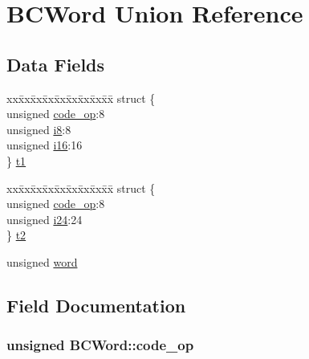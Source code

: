 \hypertarget{unionBCWord}{}\section{B\+C\+Word Union Reference}
\label{unionBCWord}
\subsection*{Data Fields}
\begin{DoxyCompactItemize}
\item 
\begin{tabbing}
xx\=xx\=xx\=xx\=xx\=xx\=xx\=xx\=xx\=\kill
struct \{\\
\>unsigned \hyperlink{unionBCWord_aade3fc7c8f3c2cd46214543bf0979e14}{code\_op}:8\\
\>unsigned \hyperlink{unionBCWord_ab9456d8bd041583a32520027206f37ca}{i8}:8\\
\>unsigned \hyperlink{unionBCWord_a8c3329540a5e15a320ee046bcc68f3b4}{i16}:16\\
\} \hyperlink{unionBCWord_a70e755edbb220fd93df2c19803233c99}{t1}\\

\end{tabbing}\item 
\begin{tabbing}
xx\=xx\=xx\=xx\=xx\=xx\=xx\=xx\=xx\=\kill
struct \{\\
\>unsigned \hyperlink{unionBCWord_aade3fc7c8f3c2cd46214543bf0979e14}{code\_op}:8\\
\>unsigned \hyperlink{unionBCWord_a1b4781c273f33c444975a5c427370504}{i24}:24\\
\} \hyperlink{unionBCWord_abbf0ee87987d69cb8a46e49454401f7c}{t2}\\

\end{tabbing}\item 
unsigned \hyperlink{unionBCWord_ae6b64a6557710fc6e57ebbd02d1a3bc1}{word}
\end{DoxyCompactItemize}


\subsection{Field Documentation}
\subsubsection[{\texorpdfstring{code\+\_\+op}{code_op}}]{\setlength{\rightskip}{0pt plus 5cm}unsigned B\+C\+Word\+::code\+\_\+op}\hypertarget{unionBCWord_aade3fc7c8f3c2cd46214543bf0979e14}{}\label{unionBCWord_aade3fc7c8f3c2cd46214543bf0979e14}
